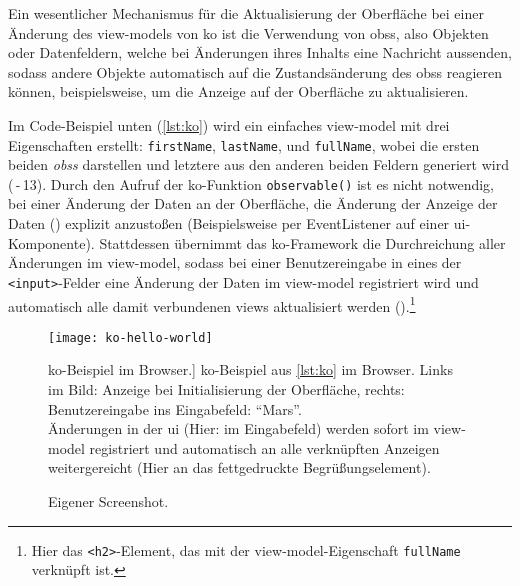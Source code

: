 Ein wesentlicher Mechanismus für die Aktualisierung der Oberfläche bei einer Änderung des \glspl{view-model} von \gls{ko} ist die Verwendung von \glspl{obs}, also Objekten oder Datenfeldern, welche bei Änderungen ihres Inhalts eine Nachricht aussenden, sodass andere Objekte automatisch auf die Zustandsänderung des \glspl{obs} reagieren können, beispielsweise, um die Anzeige auf der Oberfläche zu aktualisieren.

Im Code-Beispiel unten (\autoref{lst:ko}) wird ein einfaches \gls{view-model} mit drei Eigenschaften erstellt: \lstinline|firstName|, \lstinline|lastName|, und \lstinline|fullName|, wobei die ersten beiden \emph{\glspl{obs}} darstellen und letztere aus den anderen beiden Feldern generiert wird (\,-\,13).
Durch den Aufruf der \gls{ko}-Funktion \lstinline|observable()| ist es nicht notwendig, bei einer Änderung der Daten an der Oberfläche, die Änderung der Anzeige der Daten () explizit anzustoßen (Beispielsweise per EventListener auf einer \gls{ui}-Komponente).
Stattdessen übernimmt das \gls{ko}-Framework die Durchreichung aller Änderungen im \gls{view-model}, sodass bei einer Benutzereingabe in eines der \lstinline|<input>|-Felder eine Änderung der Daten im \gls{view-model} registriert wird und automatisch alle damit verbundenen \glspl{view} aktualisiert werden ().\footnote{Hier das \texttt{<h2>}-Element, das mit der \gls{view-model}-Eigenschaft \texttt{fullName} verknüpft ist.}

\par\noindent\begin{minipage}{\linewidth}

\end{minipage}\par\addvspace{\topskip}

\begin{figure}[h!]
\centering
\texttt{[image: ko-hello-world]}
	\caption
		[\gls{ko}-Beispiel im Browser.]
		{\gls{ko}-Beispiel aus \autoref{lst:ko} im Browser. Links im Bild: Anzeige bei Initialisierung der Oberfläche, rechts: Benutzereingabe ins Eingabefeld: \enquote{Mars}. \\ Änderungen in der \gls{ui} (Hier: im Eingabefeld) werden sofort im \gls{view-model} registriert und automatisch an alle verknüpften Anzeigen weitergereicht (Hier an das fettgedruckte Begrüßungselement).}
	\label{fig:ko-hello-world}
	\imagesourcefont
	\vspace{\imagesourcespace}
	\imagesourcefont{}
	\caption*{\imagesourcelabel Eigener Screenshot.}
\end{figure}

